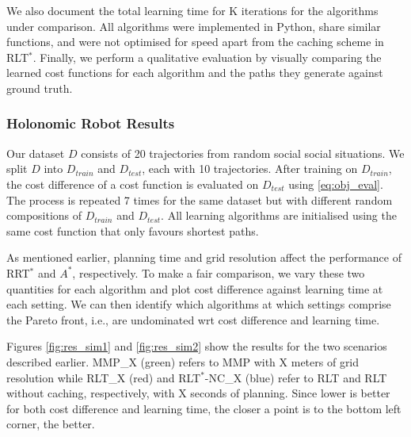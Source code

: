 \documentclass[letterpaper, 10 pt, conference]{ieeeconf}
\begin{document}
We also document the total learning time for K iterations for the algorithms under comparison.  All algorithms were implemented in Python, share similar functions, and were not optimised for speed apart from the caching scheme in RLT$^*$. Finally, we perform a qualitative evaluation by visually comparing the learned cost functions for each algorithm and the paths they generate against ground truth.

	\subsubsection{Holonomic Robot Results}

	Our dataset $D$ consists of 20 trajectories from random social social situations. We split $D$ into $D_{train}$ and $D_{test}$, each with 10 trajectories. After training on $D_{train}$, the cost difference of a cost function is evaluated on $D_{test}$ using \eqref{eq:obj_eval}. The process is repeated 7 times for the same dataset but with different random compositions of $D_{train}$ and $D_{test}$.  All learning algorithms are initialised using the same cost function that only favours shortest paths.
	
	As mentioned earlier, planning time and grid resolution affect the performance of RRT$^*$ and $A^*$, respectively. To make a fair comparison, we vary these two quantities for each algorithm and plot cost difference against learning time at each setting.  We can then identify which algorithms at which settings comprise the Pareto front, i.e., are undominated wrt cost difference and learning time.
	
	 Figures \ref{fig:res_sim1} and \ref{fig:res_sim2} show the results for the two scenarios described earlier. MMP\_X (green) refers to MMP with X meters of grid resolution while  RLT\_X (red) and RLT$^*$-NC\_X (blue) refer to RLT and RLT without caching, respectively, with X seconds of planning.  Since lower is better for both cost difference and learning time, the closer a point is to the bottom left corner, the better.
	 
\end{document}
